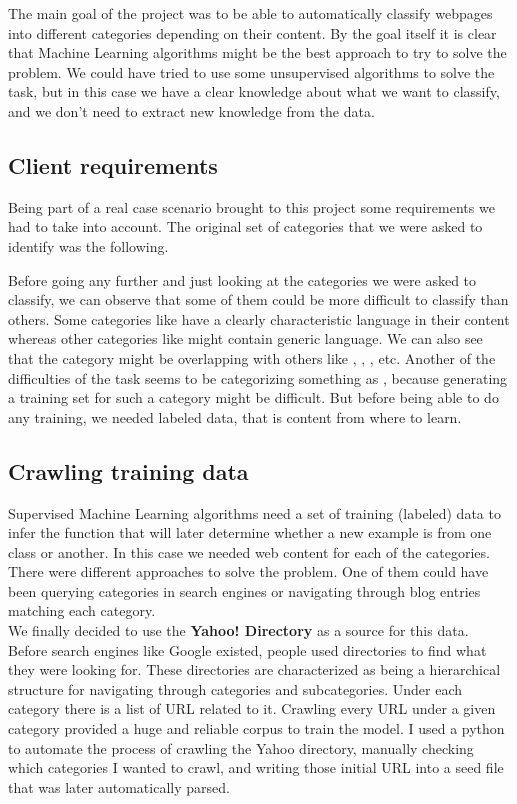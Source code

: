 
The main goal of the project was to be able to automatically classify webpages into different categories depending on their content. 
By the goal itself it is clear that Machine Learning algorithms might be the best approach to try to solve the problem. We could have tried to use some unsupervised algorithms to solve the task,
but in this case we have a clear knowledge about what we want to classify, and we don't need to extract new knowledge from the data.

\subsection{Client requirements}

Being part of a real case scenario brought to this project some requirements we had to take into account. The original set of categories that we were asked to identify was the following.


Before going any further and just looking at the categories we were asked to classify, we can observe that some of them could be more difficult to classify than others.
Some categories like  have a clearly characteristic language in their content whereas other categories like  might contain generic language.
We can also see that the category  might be overlapping with others like , , , etc. 
Another of the difficulties of the task seems to be categorizing something as , because generating a training set for such a category might be difficult. 
But before being able to do any training, we needed labeled data, that is content from where to learn.

\subsection{Crawling training data}
Supervised Machine Learning algorithms need a set of training (labeled) data to infer the function that will later determine whether a new example is from one class or another. In this case we needed
web content for each of the categories. There were different approaches to solve the problem. One of them could have been querying categories in search engines or navigating through blog entries matching
each category. \\
We finally decided to use the {\bf Yahoo! Directory}\cite{yahoo} as a source for this data.
Before search engines like Google existed, people used directories to find what they were looking for. These directories are characterized as being a hierarchical structure for navigating through categories
and subcategories. Under each category there is a list of URL related to it.  
Crawling every URL under a given category provided a huge and reliable corpus to train the model.
I used a python to automate the process of crawling the Yahoo directory, manually checking which categories I wanted to crawl, and writing those initial URL into a seed file that was later automatically parsed.


